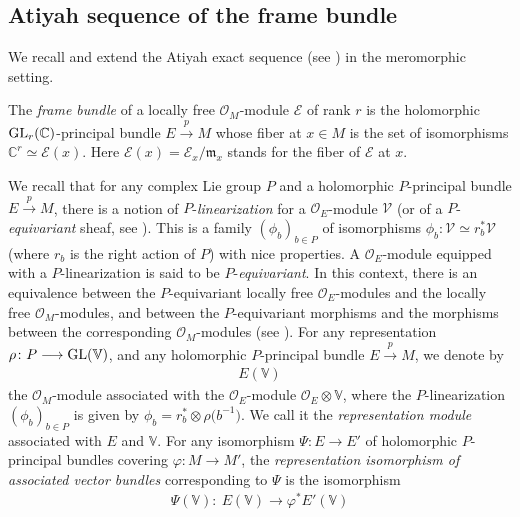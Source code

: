 \documentclass[pdftex]{sigma}
\numberwithin{equation}{section}
\begin{document}
\subsection{Atiyah sequence of the frame bundle}\label{Atiyahframe}

We recall and extend the Atiyah exact sequence (see \cite[Theorem 1]{Atiyah}) in the meromorphic setting.

The \textit{frame bundle} of a locally free $\mathcal{O}_M$-module $\mathcal{E}$ of rank $r$ is the holomorphic ${\rm GL}_r(\mathbb{C})$-principal bundle $E\overset{p}{\longrightarrow} M$ whose fiber at $x\in M$ is the set of isomorphisms $\mathbb{C}^r \simeq \mathcal{E}(x)$. Here $\mathcal{E}(x)=\mathcal{E}_x /\mathfrak{m}_x$ stands for the fiber of $\mathcal{E}$ at $x$.

We recall that for any complex Lie group $P$ and a holomorphic $P$-principal bundle $E\overset{p}{\longrightarrow} M$, there is a notion of $P$-\textit{linearization} for a $\mathcal{O}_E$-module $\mathcal{V}$ (or of a $P$-\textit{equivariant} sheaf, see \cite[Definition 9.10.3]{Hotta}). This is a family $(\phi_b)_{b\in P}$ of isomorphisms $\phi_b\colon \mathcal{V} \simeq r_b^* \mathcal{V}$ (where $r_b$ is the right action of $P$) with nice properties. A $\mathcal{O}_E$-module equipped with a $P$-linearization is said to be $P$-\textit{equivariant}. In this context, there is an equivalence between the $P$-equivariant locally free $\mathcal{O}_E$-modules and the locally free $\mathcal{O}_M$-modules, and between the $P$-equivariant morphisms and the morphisms between the corresponding $\mathcal{O}_M$-modules (see \cite[Lemma, p.~3]{Lunts}). For any representation $\rho\colon P \longrightarrow {\rm GL}(\mathbb{V})$, and any holomorphic $P$-principal bundle $E\overset{p}{\longrightarrow} M$, we denote by
\begin{gather}\label{representationmodule} E(\mathbb{V})
\end{gather}
 the $\mathcal{O}_M$-module associated with the $\mathcal{O}_E$-module $\mathcal{O}_E \otimes \mathbb{V}$, where the $P$-linearization $(\phi_b)_{b\in P}$ is given by $\phi_b = r_b^* \otimes \rho\big(b^{-1}\big)$. We call it the \textit{representation module} associated with $E$ and $\mathbb{V}$. For any isomorphism $\Psi\colon E\longrightarrow E'$ of holomorphic $P$-principal bundles covering $\varphi\colon M\longrightarrow M'$, the \textit{representation isomorphism of associated vector bundles} corresponding to $\Psi$ is the isomorphism
\begin{gather}\label{representationmorphism} \Psi(\mathbb{V})\colon\ E(\mathbb{V}) \longrightarrow \varphi^* E'(\mathbb{V})
 \end{gather}
\end{document}

